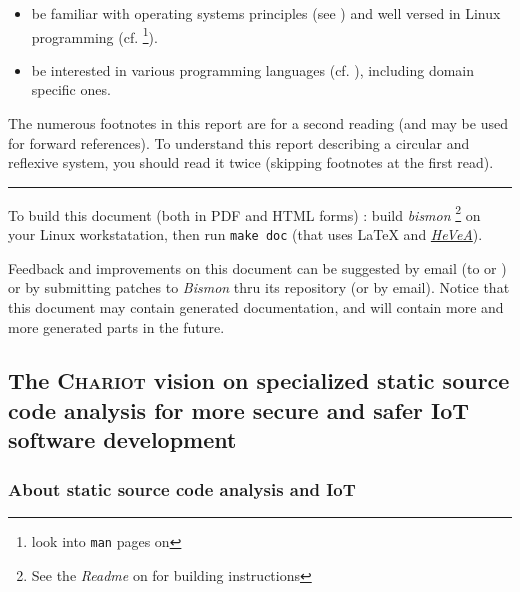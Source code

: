 \begin{itemize}
\item be familiar with operating systems principles
  (see \cite{Tanenbaum:92:OS,ArpaciDusseau14-Book}) and well
  versed in Linux programming
  (cf. \cite{Mitchell:2001:ALP,Kerrisk:2010:LinuxProgramming} \footnote{look
    into \texttt{man} pages on
    }).

  \item be interested in various programming languages
    (cf. \cite{Abelson1996:SICP,Scott:2007:PLP,Queinnec:1996:LSP}),
    including domain specific ones.

\end{itemize}



The numerous footnotes in this report are for a second reading (and
may be used for forward references). To understand this report
describing a circular and reflexive system, you should read it twice
(skipping footnotes at the first read).

\bigskip

\hrule

\medskip

To build this document (both in PDF and HTML forms) : build
\emph{bismon} \footnote{See the \emph{Readme} on
   for building
  instructions} on your Linux workstatation, then run \texttt{make
  doc} (that uses {\LaTeX} and
\href{http://hevea.inria.fr/}{\emph{HeVeA}}).

Feedback and improvements on this document can be suggested by email
(to  or
) or by submitting patches to
\textit{Bismon} thru its  repository
(or by email). Notice that this document may contain generated
documentation, and will contain more and more generated parts in the
future.

\subsection{The \textsc{Chariot} vision on specialized static source code analysis for more secure and safer IoT software development}

\subsubsection{About static source code analysis and IoT}

